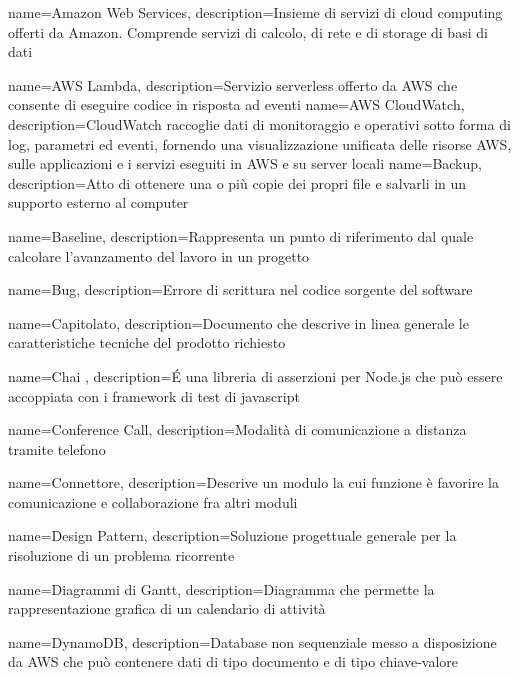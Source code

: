 {
	name={Amazon Web Services},
	description={Insieme di servizi di cloud computing offerti da Amazon. Comprende servizi di calcolo, di rete e di storage di basi di dati}
}

{
	name={AWS Lambda},
	description={Servizio serverless offerto da AWS che consente di eseguire codice in risposta ad eventi}
	{\newpage}
}
{
	name={AWS CloudWatch},
	description={CloudWatch raccoglie dati di monitoraggio e operativi sotto forma di log, parametri ed eventi, fornendo una visualizzazione unificata delle risorse AWS, sulle applicazioni e i servizi eseguiti in AWS e su server locali}
	{\newpage}
}
{
	name={Backup},
	description={Atto di ottenere una o più copie dei propri file e salvarli in un supporto esterno al computer}
}

{
	name={Baseline},
	description={Rappresenta un punto di riferimento dal quale calcolare l’avanzamento del lavoro in un progetto}
}

{
	name={Bug},
	description={Errore di scrittura nel codice sorgente del software}
	{\newpage}
}

{
	name={Capitolato},
	description={Documento che descrive in linea generale le caratteristiche tecniche del prodotto richiesto}
}

{
	name={Chai },
	description={É una libreria di asserzioni per Node.js che può essere accoppiata con i framework di test di javascript}
}

{
	name={Conference Call},
	description={Modalità di comunicazione a distanza tramite telefono}
}

{
	name={Connettore},
	description={Descrive un modulo la cui funzione è favorire la comunicazione e collaborazione fra altri moduli}
	{\newpage}
}

{
	name={Design Pattern},
	description={Soluzione progettuale generale per la risoluzione di un problema ricorrente}
}

{
	name={Diagrammi di Gantt},
	description={Diagramma che permette la rappresentazione grafica di un calendario di attività}
}

{
	name={DynamoDB},
	description={Database non sequenziale messo a disposizione da AWS che può contenere dati di tipo documento e di tipo chiave-valore}
	{\newpage}
}

